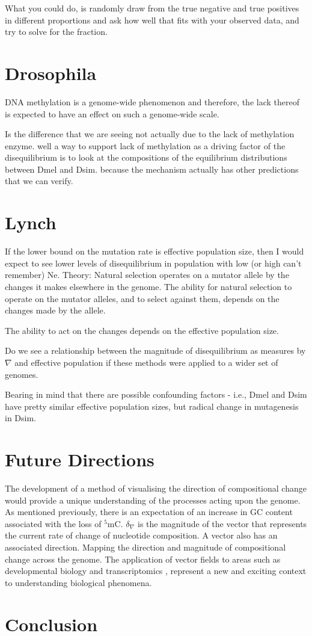 What you could do, is randomly draw from the true negative and true positives in different proportions and ask how well that fits with your observed data, and try to solve for the fraction. 



\section{Drosophila}

 DNA methylation is a genome-wide phenomenon and therefore, the lack thereof is expected to have an effect on such a genome-wide scale.  
 
 
 Is the difference that we are seeing not actually due to the lack of methylation enzyme. well a way to support lack of methylation as a driving factor of the disequilibrium is to look at the compositions of the equilibrium distributions between Dmel and Dsim. because the mechanism actually has other predictions that we can verify. 

\section{Lynch}

If the lower bound on the mutation rate is effective population size, then I would expect to see lower levels of disequilibrium in population with low (or high can't remember) Ne. 
Theory: Natural selection operates on a mutator allele by the changes it makes elsewhere in the genome. 
The ability for natural selection to operate on the mutator alleles, and to select against them, depends on the changes made by the allele. 

The ability to act on the changes depends on the effective population size. 

Do we see a relationship between the magnitude of disequilibrium as measures by $\nabla$ and effective population if these methods were applied to a wider set of genomes. 

Bearing in mind that there are possible confounding factors - i.e., Dmel and Dsim have pretty similar effective population sizes, but radical change in mutagenesis in Dsim. 



\section{Future Directions}


The development of a method of visualising the direction of compositional change would provide a unique understanding of the processes acting upon the genome. As mentioned previously, there is an expectation of an increase in GC content associated with the loss of $^5$mC. $\delta_\nabla$ is the magnitude of the vector that represents the current rate of change of nucleotide composition. A vector also has an associated direction. Mapping the direction and magnitude of compositional change across the genome. The application of vector fields to areas such as developmental biology \citep{Steiner2009VectorEmbryogeny} and transcriptomics \citep{Qiu2021MappingCells}, represent a new and exciting context to understanding biological phenomena. 


\section{Conclusion}